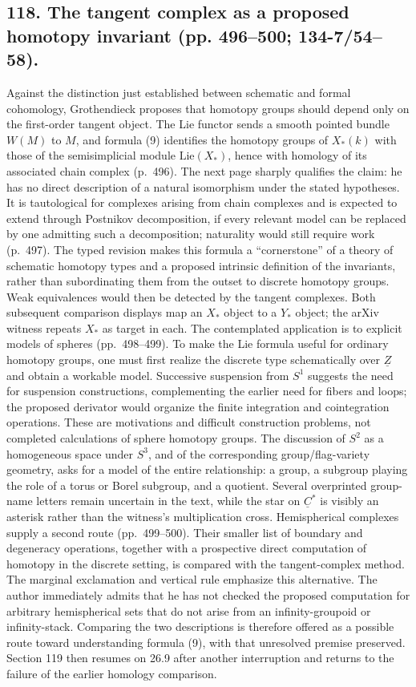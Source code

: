 \documentclass[10pt,oneside]{book}
\begin{document}
\subsection*{118. The tangent complex as a proposed homotopy invariant (pp. 496--500; 134-7/54--58).}
Against the distinction just established between schematic and formal cohomology, Grothendieck proposes that homotopy groups should depend only on the first-order tangent object. The Lie functor sends a smooth pointed bundle $W(M)$ to $M$, and formula (9) identifies the homotopy groups of $X_*(k)$ with those of the semisimplicial module $\mathrm{Lie}(X_*)$, hence with homology of its associated chain complex (p.~496). The next page sharply qualifies the claim: he has no direct description of a natural isomorphism under the stated hypotheses. It is tautological for complexes arising from chain complexes and is expected to extend through Postnikov decomposition, if every relevant model can be replaced by one admitting such a decomposition; naturality would still require work (p.~497). The typed revision makes this formula a ``cornerstone'' of a theory of schematic homotopy types and a proposed intrinsic definition of the invariants, rather than subordinating them from the outset to discrete homotopy groups. Weak equivalences would then be detected by the tangent complexes. Both subsequent comparison displays map an $X_*$ object to a $Y_*$ object; the arXiv witness repeats $X_*$ as target in each. The contemplated application is to explicit models of spheres (pp.~498--499). To make the Lie formula useful for ordinary homotopy groups, one must first realize the discrete type schematically over $\underline Z$ and obtain a workable model. Successive suspension from $S^1$ suggests the need for suspension constructions, complementing the earlier need for fibers and loops; the proposed derivator would organize the finite integration and cointegration operations. These are motivations and difficult construction problems, not completed calculations of sphere homotopy groups. The discussion of $S^2$ as a homogeneous space under $S^3$, and of the corresponding group/flag-variety geometry, asks for a model of the entire relationship: a group, a subgroup playing the role of a torus or Borel subgroup, and a quotient. Several overprinted group-name letters remain uncertain in the text, while the star on $\underline C^*$ is visibly an asterisk rather than the witness's multiplication cross. Hemispherical complexes supply a second route (pp.~499--500). Their smaller list of boundary and degeneracy operations, together with a prospective direct computation of homotopy in the discrete setting, is compared with the tangent-complex method. The marginal exclamation and vertical rule emphasize this alternative. The author immediately admits that he has not checked the proposed computation for arbitrary hemispherical sets that do not arise from an infinity-groupoid or infinity-stack. Comparing the two descriptions is therefore offered as a possible route toward understanding formula (9), with that unresolved premise preserved. Section 119 then resumes on 26.9 after another interruption and returns to the failure of the earlier homology comparison.
\end{document}
